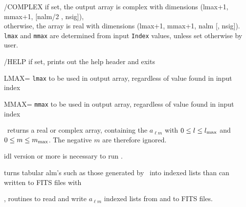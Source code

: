 \begin{keywords}
  \begin{kwlist}{} %
    \item[/COMPLEX] %
if set, the output array is complex with dimensions
          (lmax+1, mmax+1, [nalm/2 , nsig]),\\
      otherwise, the array is real with dimensions
          (lmax+1, mmax+1, nalm [, nsig]). \\
{\tt lmax} and {\tt mmax} are determined from input {\tt Index} values, unless set otherwise
by user.
    \item[/HELP] %
	if set, prints out the help header and exits
    \item[LMAX=] %
{\tt lmax} to be used in output array, regardless of
      value found in input index
    \item[MMAX=] %
{\tt mmax} to be used in output array, regardless of
      value found in input index
  \end{kwlist}
\end{keywords}  

\begin{codedescription}
{%
\thedocid\ returns a real or complex array, containing the $a_{\ell m}$ with
$0 \le l \le l_{\mathrm{max}}$ and $0 \le m \le m_{\mathrm{max}}$. The negative $m$ are
therefore ignored.
}
\end{codedescription}



\begin{related}
  \begin{sulist}{} %
    \item[idl] version \idlversion or more is necessary to run \thedocid.
    \item[\htmlref{alm\_t2i}{idl:alm_t2i}] turns tabular alm's such as those generated by
\thedocid\ into indexed lists than can written to FITS files with
  \item[\htmlref{alm2fits}{idl:alm2fits}, \htmlref{fits2alm}{idl:fits2alm}]
routines to read and write $a_{\ell m}$ indexed lists from and to FITS files.
  \end{sulist}
\end{related}

